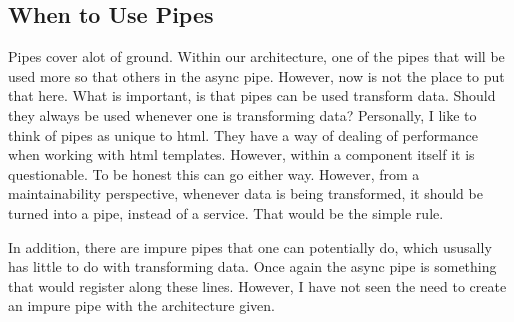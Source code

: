 \subsection{ When to Use Pipes }
Pipes cover alot of ground. Within our architecture, one of the pipes that will
be used more so that others in the async pipe. However, now is not the place
to put that here. What is important, is that pipes can be used transform data.
Should they always be used whenever one is transforming data? Personally,
I like to think of pipes as unique to html. They have a way of dealing of
performance when working with html templates. However, within a component
itself it is questionable. To be honest this can go either way. However, from a
maintainability perspective, whenever data is being transformed, it should be
turned into a pipe, instead of a service. That would be the simple rule.

In addition, there are impure pipes that one can potentially do, which ususally
has little to do with transforming data. Once again the async pipe is something
that would register along these lines. However, I have not seen the need to
create an impure pipe with the architecture given.
